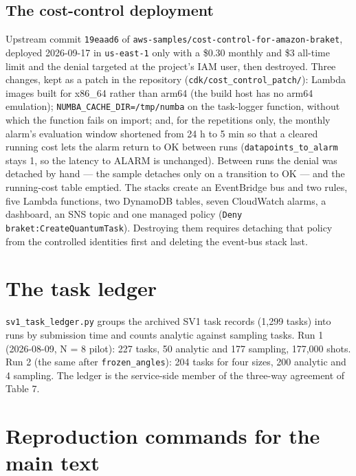 \documentclass[acmsmall,screen,review]{acmart}
\begin{document}
\subsection{The cost-control deployment}

Upstream commit \texttt{19eaad6} of \texttt{aws-\allowbreak{}samples/\allowbreak{}cost-\allowbreak{}control-\allowbreak{}for-\allowbreak{}amazon-\allowbreak{}braket}, deployed 2026-09-17 in \texttt{us-east-1} only with a \$0.30 monthly and \$3 all-time limit and the denial targeted at the project's IAM user, then destroyed. Three changes, kept as a patch in the repository (\texttt{cdk/\allowbreak{}cost\_\allowbreak{}control\_\allowbreak{}patch/\allowbreak{}}): Lambda images built for x86\_64 rather than arm64 (the build host has no arm64 emulation); \texttt{NUMBA\_\allowbreak{}CACHE\_\allowbreak{}DIR=/\allowbreak{}tmp/\allowbreak{}numba} on the task-logger function, without which the function fails on import; and, for the repetitions only, the monthly alarm's evaluation window shortened from 24 h to 5 min so that a cleared running cost lets the alarm return to OK between runs (\texttt{datapoints\_\allowbreak{}to\_\allowbreak{}alarm} stays 1, so the latency to ALARM is unchanged). Between runs the denial was detached by hand --- the sample detaches only on a transition to OK --- and the running-cost table emptied. The stacks create an EventBridge bus and two rules, five Lambda functions, two DynamoDB tables, seven CloudWatch alarms, a dashboard, an SNS topic and one managed policy (\texttt{Deny braket:\allowbreak{}Create\allowbreak{}Quantum\allowbreak{}Task}). Destroying them requires detaching that policy from the controlled identities first and deleting the event-bus stack last.


\section{The task ledger}

\texttt{sv1\_\allowbreak{}task\_\allowbreak{}ledger.\allowbreak{}py} groups the archived SV1 task records (1,299 tasks) into runs by submission time and counts analytic against sampling tasks. Run 1 (2026-08-09, N = 8 pilot): 227 tasks, 50 analytic and 177 sampling, 177,000 shots. Run 2 (the same after \texttt{frozen\_angles}): 204 tasks for four sizes, 200 analytic and 4 sampling. The ledger is the service-side member of the three-way agreement of Table 7.


\section{Reproduction commands for the main text}
\end{document}
